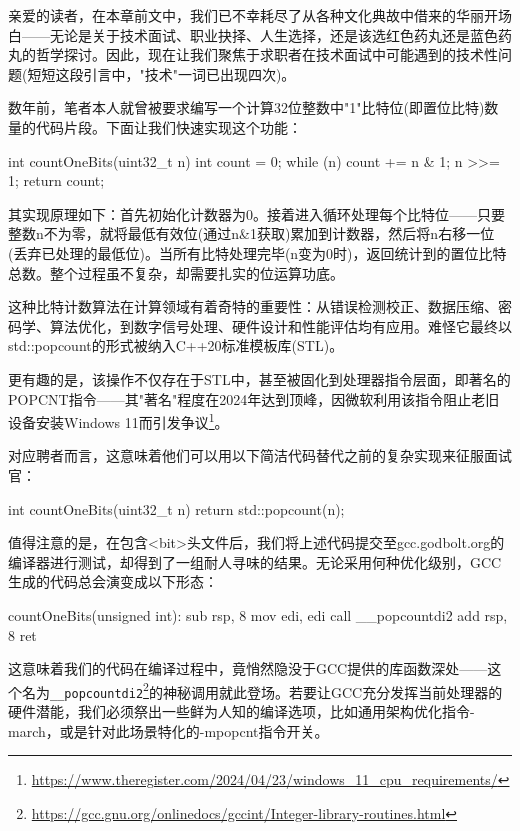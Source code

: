 亲爱的读者，在本章前文中，我们已不幸耗尽了从各种文化典故中借来的华丽开场白——无论是关于技术面试、职业抉择、人生选择，还是该选红色药丸还是蓝色药丸的哲学探讨。因此，现在让我们聚焦于求职者在技术面试中可能遇到的技术性问题(短短这段引言中，"技术"一词已出现四次)。

数年前，笔者本人就曾被要求编写一个计算32位整数中"1"比特位(即置位比特)数量的代码片段。下面让我们快速实现这个功能：

\begin{cpp}
int countOneBits(uint32_t n) {
  int count = 0;
  while (n) {
    count += n & 1;
    n >>= 1;
  }
  return count;
}
\end{cpp}

其实现原理如下：首先初始化计数器为0。接着进入循环处理每个比特位——只要整数n不为零，就将最低有效位(通过n\&1获取)累加到计数器，然后将n右移一位(丢弃已处理的最低位)。当所有比特处理完毕(n变为0时)，返回统计到的置位比特总数。整个过程虽不复杂，却需要扎实的位运算功底。

这种比特计数算法在计算领域有着奇特的重要性：从错误检测校正、数据压缩、密码学、算法优化，到数字信号处理、硬件设计和性能评估均有应用。难怪它最终以std::popcount的形式被纳入C++20标准模板库(STL)。

更有趣的是，该操作不仅存在于STL中，甚至被固化到处理器指令层面，即著名的POPCNT指令——其"著名"程度在2024年达到顶峰，因微软利用该指令阻止老旧设备安装Windows 11而引发争议\footnote{\url{https://www.theregister.com/2024/04/23/windows_11_cpu_requirements/}}。

对应聘者而言，这意味着他们可以用以下简洁代码替代之前的复杂实现来征服面试官：

\begin{cpp}
int countOneBits(uint32_t n) {
  return std::popcount(n);
}
\end{cpp}

值得注意的是，在包含<bit>头文件后，我们将上述代码提交至gcc.godbolt.org的编译器进行测试，却得到了一组耐人寻味的结果。无论采用何种优化级别，GCC生成的代码总会演变成以下形态：

\begin{shell}
countOneBits(unsigned int):
  sub rsp, 8
  mov edi, edi
  call __popcountdi2
  add rsp, 8
  ret
\end{shell}

这意味着我们的代码在编译过程中，竟悄然隐没于GCC提供的库函数深处——这个名为\verb|__popcountdi2|\footnote{\url{https://gcc.gnu.org/onlinedocs/gccint/Integer-library-routines.html}}的神秘调用就此登场。若要让GCC充分发挥当前处理器的硬件潜能，我们必须祭出一些鲜为人知的编译选项，比如通用架构优化指令-march，或是针对此场景特化的-mpopcnt指令开关。

